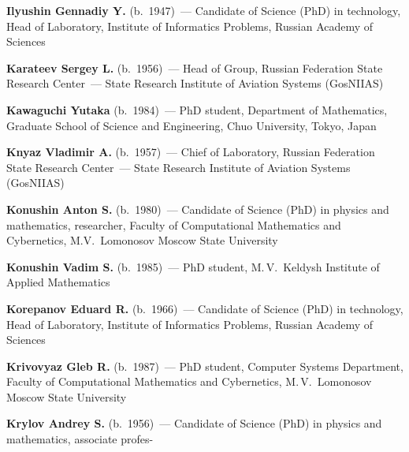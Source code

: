 \begin{multicols}{2}
\noindent
\textbf{Ilyushin Gennadiy Y.} (b.\ 1947)~--- Candidate of Science (PhD) in technology, 
Head of Laboratory, Institute of Informatics Problems, Russian Academy of Sciences  


\noindent
\textbf{Karateev Sergey L.} (b.\ 1956)~--- Head of Group,
Russian Federation State Research Center~--- State Research
Institute of Aviation Systems (GosNIIAS)


\noindent
\textbf{Kawaguchi Yutaka} (b.\ 1984)~--- PhD student, Department of Mathematics, Graduate School of Science and Engineering,
Chuo University, Tokyo, Japan


\noindent
\textbf{Knyaz Vladimir A.} (b.\ 1957)~--- Chief of Laboratory,
Russian Federation State Research Center~--- State Research
Institute of Aviation Systems (GosNIIAS)


\noindent
\textbf{Konushin Anton S.} (b.\ 1980)~--- Candidate of Science (PhD) in physics and mathematics, 
researcher, Faculty of Computational Mathematics and Cybernetics, M.V.~Lomonosov Moscow State University 


\noindent
\textbf{Konushin Vadim S.} (b.\ 1985)~--- PhD student, M.\,V.~Keldysh Institute of Applied Mathematics


\noindent
\textbf{Korepanov Eduard R.} (b.\ 1966)~--- Candidate of Science (PhD) in technology, 
Head of Laboratory, Institute of Informatics Problems, Russian Academy of Sciences


\noindent
\textbf{Krivovyaz Gleb R.} (b.\ 1987)~--- PhD student, Computer Systems Department, Faculty
of Computational Mathematics and Cybernetics, M.\,V.~Lomonosov Moscow State University


\noindent
\textbf{Krylov Andrey S.} (b.\ 1956)~--- Candidate of Science (PhD) in physics and mathematics, associate profes-\linebreak
\columnbreak


\end{multicols}
